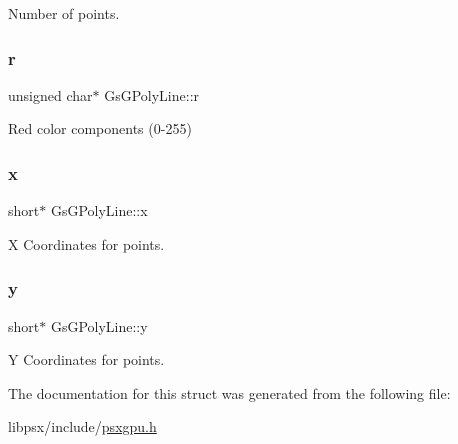 Number of points. 

\mbox{\label{structGsGPolyLine_ae3def8c38d1ce8654453993918dc5083}} 
\subsubsection{\texorpdfstring{r}{r}}
{\footnotesize\ttfamily unsigned char$\ast$ Gs\+G\+Poly\+Line\+::r}



Red color components (0-\/255) 

\mbox{\label{structGsGPolyLine_a06f46b93f3b97a8bfc6acee0789d0133}} 
\subsubsection{\texorpdfstring{x}{x}}
{\footnotesize\ttfamily short$\ast$ Gs\+G\+Poly\+Line\+::x}



X Coordinates for points. 

\mbox{\label{structGsGPolyLine_a8213528a633323574c70651761ea83be}} 
\subsubsection{\texorpdfstring{y}{y}}
{\footnotesize\ttfamily short$\ast$ Gs\+G\+Poly\+Line\+::y}



Y Coordinates for points. 



The documentation for this struct was generated from the following file\+:\begin{DoxyCompactItemize}
\item 
libpsx/include/\hyperlink{psxgpu_8h}{psxgpu.\+h}\end{DoxyCompactItemize}
